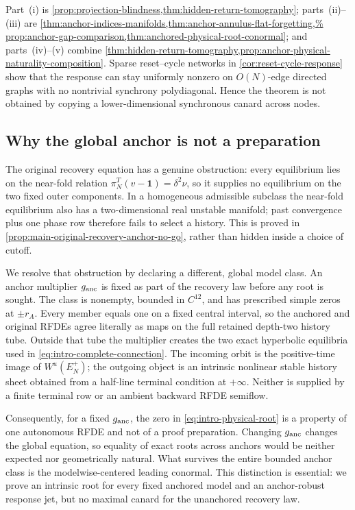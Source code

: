 Part~\textup{(i)} is \cref{prop:projection-blindness,thm:hidden-return-tomography};
parts~\textup{(ii)}--\textup{(iii)} are
\cref{thm:anchor-indices-manifolds,thm:anchor-annulus-flat-forgetting,%
prop:anchor-gap-comparison,thm:anchored-physical-root-conormal}; and
parts~\textup{(iv)}--\textup{(v)} combine
\cref{thm:hidden-return-tomography,prop:anchor-physical-naturality-composition}.
Sparse reset--cycle networks in \cref{cor:reset-cycle-response} show that the
response can stay uniformly nonzero on \(O(N)\)-edge directed graphs with no
nontrivial synchrony polydiagonal.  Hence the theorem is not obtained by
copying a lower-dimensional synchronous canard across nodes.



\subsection{Why the global anchor is not a preparation}

The original recovery equation has a genuine obstruction: every equilibrium
lies on the near-fold relation
\(\pi_N^T(v-\mathbf1)=\delta^2\nu\), so it supplies no equilibrium on the
two fixed outer components.  In a homogeneous admissible subclass the
near-fold equilibrium also has a two-dimensional real unstable manifold;
past convergence plus one phase row therefore fails to select a history.
This is proved in \cref{prop:main-original-recovery-anchor-no-go}, rather than
hidden inside a choice of cutoff.

We resolve that obstruction by declaring a different, global model class.
An anchor multiplier \(g_{\rm anc}\) is fixed as part of the recovery law
before any root is sought.  The class is nonempty, bounded in \(C^{12}\), and
has prescribed simple zeros at \(\pm r_A\).  Every member equals one on a
fixed central interval, so the anchored and original RFDEs agree literally as
maps on the full retained depth-two history tube.  Outside that tube the
multiplier creates the two exact hyperbolic equilibria used in
\cref{eq:intro-complete-connection}.  The incoming orbit is the positive-time
image of \(W^u(E_N^+)\); the outgoing object is an intrinsic nonlinear stable
history sheet obtained from a half-line terminal condition at \(+\infty\).
Neither is supplied by a finite terminal row or an ambient backward RFDE
semiflow.

Consequently, for a fixed \(g_{\rm anc}\), the zero in
\cref{eq:intro-physical-root} is a property of one autonomous RFDE and not of
a proof preparation.  Changing \(g_{\rm anc}\) changes the global equation,
so equality of exact roots across anchors would be neither expected nor
geometrically natural.  What survives the entire bounded anchor class is the
modelwise-centered leading conormal.  This distinction is essential: we prove
an intrinsic root for every fixed anchored model and an anchor-robust response
jet, but no maximal canard for the unanchored recovery law.

